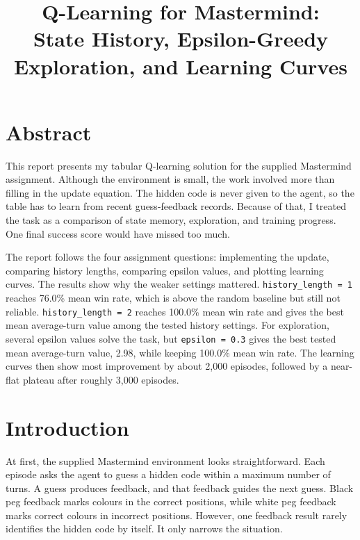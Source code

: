 \documentclass[11pt,a4paper]{article}
\title{Q-Learning for Mastermind:\\State History, Epsilon-Greedy Exploration, and Learning Curves}
\author{}
\date{}
\begin{document}
\maketitle
\tableofcontents
\clearpage
{}
{}
\listoffigures
\clearpage
{}
{}
\listoftables
\clearpage

\section*{Abstract}

This report presents my tabular Q-learning solution for the supplied Mastermind assignment. Although the environment is small, the work involved more than filling in the update equation. The hidden code is never given to the agent, so the table has to learn from recent guess-feedback records. Because of that, I treated the task as a comparison of state memory, exploration, and training progress. One final success score would have missed too much.

The report follows the four assignment questions: implementing the update, comparing history lengths, comparing epsilon values, and plotting learning curves. The results show why the weaker settings mattered. \texttt{history\_length = 1} reaches 76.0\% mean win rate, which is above the random baseline but still not reliable. \texttt{history\_length = 2} reaches 100.0\% mean win rate and gives the best mean average-turn value among the tested history settings. For exploration, several epsilon values solve the task, but \texttt{epsilon = 0.3} gives the best tested mean average-turn value, 2.98, while keeping 100.0\% mean win rate. The learning curves then show most improvement by about 2{,}000 episodes, followed by a near-flat plateau after roughly 3{,}000 episodes.

\section{Introduction}

At first, the supplied Mastermind environment looks straightforward. Each episode asks the agent to guess a hidden code within a maximum number of turns. A guess produces feedback, and that feedback guides the next guess. Black peg feedback marks colours in the correct positions, while white peg feedback marks correct colours in incorrect positions. However, one feedback result rarely identifies the hidden code by itself. It only narrows the situation.
\end{document}
